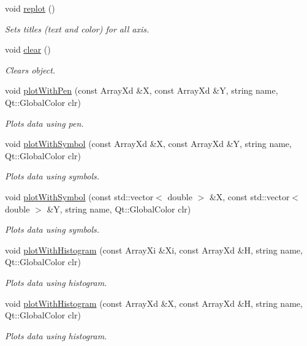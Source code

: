 \begin{DoxyCompactItemize}
void \hyperlink{class_c_plot2_d_a8a4279b0dce8f4c6211b889898a72ba8}{replot} ()
\begin{DoxyCompactList}\small\item\em Sets titles (text and color) for all axis. \end{DoxyCompactList}\item 
void \hyperlink{class_c_plot2_d_a4ea1db373775fa3ea8411b6da428abee}{clear} ()
\begin{DoxyCompactList}\small\item\em Clears object. \end{DoxyCompactList}\item 
void \hyperlink{class_c_plot2_d_a5bdce50a9d19c1b1984dfa95140b05b4}{plot\-With\-Pen} (const Array\-Xd \&X, const Array\-Xd \&Y, string name, Qt\-::\-Global\-Color clr)
\begin{DoxyCompactList}\small\item\em Plots data using pen. \end{DoxyCompactList}\item 
void \hyperlink{class_c_plot2_d_a8cfde68202cdef9abbaa0c61e742c1fe}{plot\-With\-Symbol} (const Array\-Xd \&X, const Array\-Xd \&Y, string name, Qt\-::\-Global\-Color clr)
\begin{DoxyCompactList}\small\item\em Plots data using symbols. \end{DoxyCompactList}\item 
void \hyperlink{class_c_plot2_d_a953dd4f846fd81ae9adc527d072713c2}{plot\-With\-Symbol} (const std\-::vector$<$ double $>$ \&X, const std\-::vector$<$ double $>$ \&Y, string name, Qt\-::\-Global\-Color clr)
\begin{DoxyCompactList}\small\item\em Plots data using symbols. \end{DoxyCompactList}\item 
void \hyperlink{class_c_plot2_d_ac29ef6ddb8c2d2f64332b90476cfb601}{plot\-With\-Histogram} (const Array\-Xi \&Xi, const Array\-Xd \&H, string name, Qt\-::\-Global\-Color clr)
\begin{DoxyCompactList}\small\item\em Plots data using histogram. \end{DoxyCompactList}\item 
void \hyperlink{class_c_plot2_d_ab68706ba0a4f3220108269830490f8c0}{plot\-With\-Histogram} (const Array\-Xd \&X, const Array\-Xd \&H, string name, Qt\-::\-Global\-Color clr)
\begin{DoxyCompactList}\small\item\em Plots data using histogram. \end{DoxyCompactList}\item 

\end{DoxyCompactItemize}
